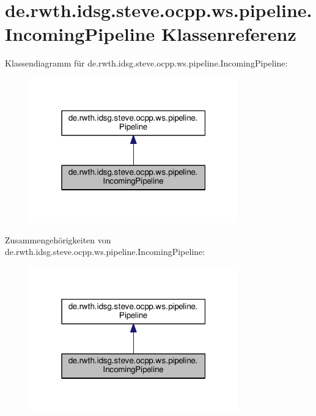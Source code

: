 \hypertarget{classde_1_1rwth_1_1idsg_1_1steve_1_1ocpp_1_1ws_1_1pipeline_1_1_incoming_pipeline}{\section{de.\+rwth.\+idsg.\+steve.\+ocpp.\+ws.\+pipeline.\+Incoming\+Pipeline Klassenreferenz}
\label{classde_1_1rwth_1_1idsg_1_1steve_1_1ocpp_1_1ws_1_1pipeline_1_1_incoming_pipeline}
}


Klassendiagramm für de.\+rwth.\+idsg.\+steve.\+ocpp.\+ws.\+pipeline.\+Incoming\+Pipeline\+:\nopagebreak
\begin{figure}[H]
\begin{center}
\leavevmode
\includegraphics[width=256pt]{classde_1_1rwth_1_1idsg_1_1steve_1_1ocpp_1_1ws_1_1pipeline_1_1_incoming_pipeline__inherit__graph}
\end{center}
\end{figure}


Zusammengehörigkeiten von de.\+rwth.\+idsg.\+steve.\+ocpp.\+ws.\+pipeline.\+Incoming\+Pipeline\+:\nopagebreak
\begin{figure}[H]
\begin{center}
\leavevmode
\includegraphics[width=256pt]{classde_1_1rwth_1_1idsg_1_1steve_1_1ocpp_1_1ws_1_1pipeline_1_1_incoming_pipeline__coll__graph}
\end{center}
\end{figure}
